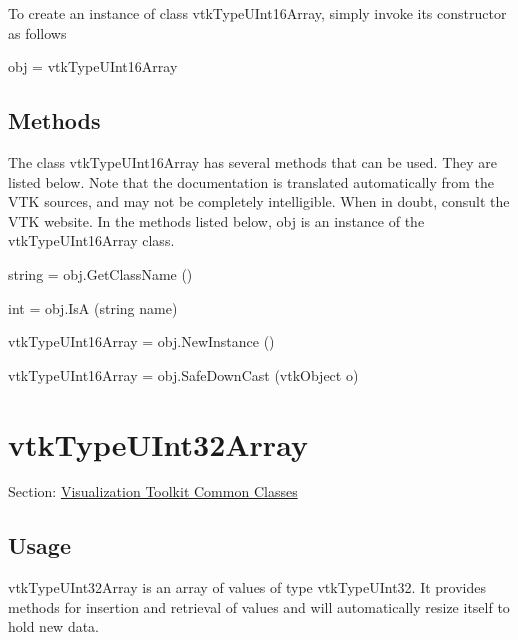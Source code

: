 To create an instance of class vtk\-Type\-U\-Int16\-Array, simply invoke its constructor as follows \begin{DoxyVerb}  obj = vtkTypeUInt16Array
\end{DoxyVerb}
 \hypertarget{vtkwidgets_vtkxyplotwidget_Methods}{}\subsection{Methods}\label{vtkwidgets_vtkxyplotwidget_Methods}
The class vtk\-Type\-U\-Int16\-Array has several methods that can be used. They are listed below. Note that the documentation is translated automatically from the V\-T\-K sources, and may not be completely intelligible. When in doubt, consult the V\-T\-K website. In the methods listed below, {\ttfamily obj} is an instance of the vtk\-Type\-U\-Int16\-Array class. 
\begin{DoxyItemize}
\item {\ttfamily string = obj.\-Get\-Class\-Name ()}  
\item {\ttfamily int = obj.\-Is\-A (string name)}  
\item {\ttfamily vtk\-Type\-U\-Int16\-Array = obj.\-New\-Instance ()}  
\item {\ttfamily vtk\-Type\-U\-Int16\-Array = obj.\-Safe\-Down\-Cast (vtk\-Object o)}  
\end{DoxyItemize}\hypertarget{vtkcommon_vtktypeuint32array}{}\section{vtk\-Type\-U\-Int32\-Array}\label{vtkcommon_vtktypeuint32array}
Section\-: \hyperlink{sec_vtkcommon}{Visualization Toolkit Common Classes} \hypertarget{vtkwidgets_vtkxyplotwidget_Usage}{}\subsection{Usage}\label{vtkwidgets_vtkxyplotwidget_Usage}
vtk\-Type\-U\-Int32\-Array is an array of values of type vtk\-Type\-U\-Int32. It provides methods for insertion and retrieval of values and will automatically resize itself to hold new data.

